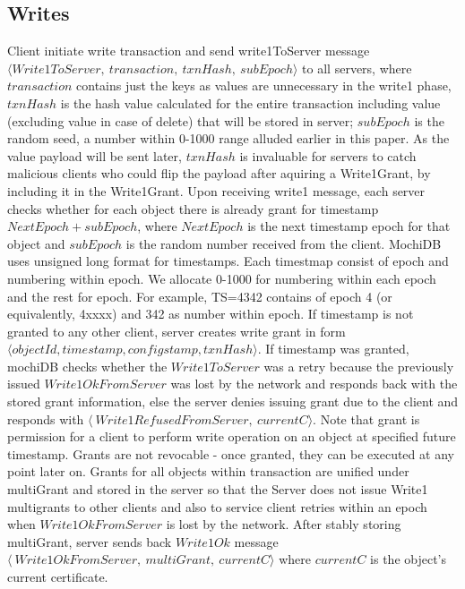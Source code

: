 \documentclass[letterpaper,twocolumn,10pt]{article}
\begin{document}
\subsection{Writes} \label{Protocol_Writes}
Client initiate write transaction and send write1ToServer message $\langle Write1ToServer,\ transaction,\ txnHash,\ subEpoch \rangle$ to all servers, where $transaction$ contains just the keys as values are unnecessary in the write1 phase, $txnHash$ is the hash value calculated for the entire transaction including value (excluding value in case of delete) that will be stored in server; $subEpoch$ is the random seed, a number within 0-1000 range alluded earlier in this paper. As the value payload will be sent later, $txnHash$ is invaluable for servers to catch malicious clients who could flip the payload after aquiring a Write1Grant, by including it in the Write1Grant. Upon receiving write1 message, each server checks whether for each object there is already grant for timestamp $NextEpoch + subEpoch$, where $NextEpoch$ is the next timestamp epoch for that object and $subEpoch$ is the random number received from the client. MochiDB uses unsigned long format for timestamps. Each timestmap consist of epoch and numbering within epoch. We allocate 0-1000 for numbering within each epoch and the rest for epoch. For example, TS=4342 contains of epoch 4 (or equivalently, 4xxxx) and 342 as number within epoch. If timestamp is not granted to any other client, server creates write grant in form $\langle objectId, timestamp, configstamp, txnHash \rangle$. If timestamp was granted, mochiDB checks whether the $Write1ToServer$ was a retry because the previously issued $Write1OkFromServer$ was lost by the network  and responds back with the stored grant information, else the server denies issuing grant due to the client and responds with $\langle\ Write1RefusedFromServer,\ currentC\rangle$. Note that grant is permission for a client to perform write operation on an object at specified future timestamp. Grants are not revocable - once granted, they can be executed at any point later on. Grants for all objects within transaction are unified under multiGrant and stored in the server so that the Server does not issue Write1 multigrants to other clients and also to service client retries within an epoch when $Write1OkFromServer$ is lost by the network. After stably storing multiGrant, server sends back $Write1Ok$ message $\langle\ Write1OkFromServer,\ multiGrant,\ currentC \rangle$ where $currentC$ is the object's current certificate. 
\end{document}

